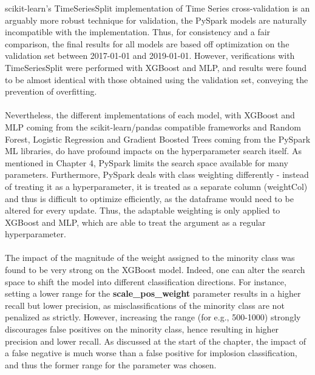 \documentclass[a4paper]{report}
\begin{document}
scikit-learn's TimeSeriesSplit implementation of Time Series cross-validation is an arguably more robust technique for validation, the PySpark models are naturally incompatible with the implementation. 
Thus, for consistency and a fair comparison, the final results for all models are based off optimization on the validation set between 2017-01-01 and 2019-01-01. However, verifications with TimeSeriesSplit
were performed with XGBoost and MLP, and results were found to be almost identical with those obtained using the validation set, conveying the prevention of overfitting. \\\\Nevertheless, the different 
implementations of each model, with XGBoost and MLP coming from 
the scikit-learn/pandas compatible frameworks and Random Forest, Logistic Regression and Gradient Boosted Trees coming from the PySpark ML libraries, do have profound impacts on the hyperparameter search itself. As mentioned 
in Chapter 4, PySpark limits the search space available for many parameters. Furthermore, PySpark deals with class weighting differently - instead of treating it as a hyperparameter, it is treated 
as a separate column (weightCol) and thus is difficult to optimize efficiently, as the dataframe would need to be altered for every update. Thus, the adaptable weighting 
is only applied to XGBoost and MLP, which are able to treat the argument as a regular hyperparameter.\\\\The impact of the magnitude of the weight assigned to the minority class 
was found to be very strong on the XGBoost model. Indeed, one can alter the search space to shift the model into different classification directions. For instance, 
setting a lower range for the \textbf{scale\_pos\_weight} parameter results in a higher recall but lower precision, as misclassifications of the minority class are not penalized 
as strictly. However, increasing the range (for e.g., 500-1000) strongly discourages false positives on the minority class, hence resulting in higher precision and lower recall. As 
discussed at the start of the chapter, the impact of a false negative is much worse than a false positive for implosion classification, and thus the former range for  
the parameter was chosen.


\end{document}
